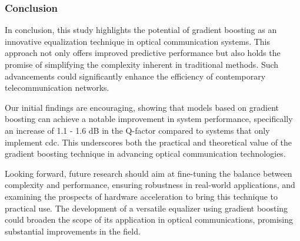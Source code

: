 \subsubsection{Conclusion}


In conclusion, this study highlights the potential of gradient boosting as an innovative equalization technique in optical communication systems. This approach not only offers improved predictive performance but also holds the promise of simplifying the complexity inherent in traditional methods. Such advancements could significantly enhance the efficiency of contemporary telecommunication networks. 

Our initial findings are encouraging, showing that models based on gradient boosting can achieve a notable improvement in system performance, specifically an increase of 1.1 - 1.6 dB in the Q-factor compared to systems that only implement \acrfull{cdc}. This underscores both the practical and theoretical value of the gradient boosting technique in advancing optical communication technologies.

Looking forward, future research should aim at fine-tuning the balance between complexity and performance, ensuring robustness in real-world applications, and examining the prospects of hardware acceleration to bring this technique to practical use. The development of a versatile equalizer using gradient boosting could broaden the scope of its application in optical communications, promising substantial improvements in the field.
